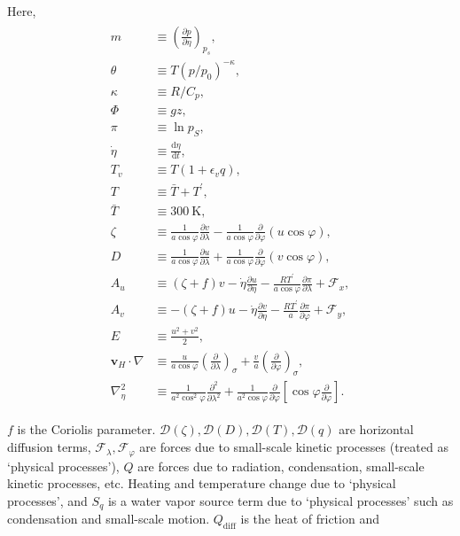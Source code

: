 Here, \begin{eqnarray}
\begin{aligned}
m &\equiv  \left(\frac{\partial p}{\partial \eta}\right)_{p_s}, \\
\theta  &\equiv   T \left( p/p_{0} \right)^{-\kappa}, \\
\kappa  &\equiv   R/C_{p}, \\
\Phi  &\equiv   gz, \\
\pi  &\equiv   \ln p_{S}, \\
\dot{\eta}  &\equiv    \frac{\mathrm{d}\eta}{\mathrm{d}t}, \\
T_v  &\equiv   T ( 1+\epsilon_v q ), \\
T  &\equiv   \bar{T} + T^{\prime}, \\
\bar{T}&\equiv 300 \ \mathrm{K}, \\
\zeta  &\equiv  \frac{1}{a \cos\varphi }
\frac{\partial v}{\partial \lambda}
-    \frac{1}{a \cos\varphi }
\frac{\partial }{\partial \varphi}
( u \cos\varphi ), \\
D  &\equiv \frac{1}{a \cos\varphi }
\frac{\partial u}{\partial \lambda}
+    \frac{1}{a \cos\varphi }
\frac{\partial }{\partial \varphi}
( v \cos\varphi ), \\
A_u  &\equiv ( \zeta + f ) v
- \dot{\eta} \frac{\partial u}{\partial \eta}
- \frac{RT^{\prime}}{a\cos\varphi}
\frac{\partial \pi}{\partial \lambda}
+ {\mathcal F}_x, \\
A_v  &\equiv - ( \zeta + f ) u
- \dot{\eta} \frac{\partial v}{\partial \eta}
- \frac{RT^{\prime}}{a}
\frac{\partial \pi}{\partial \varphi}
+ {\mathcal F}_y, \\
E  &\equiv \frac{u^{2}+v^{2}}{2}, \\
{\mathbf{v}}_{H} \cdot \nabla
&\equiv \frac{u}{a \cos \varphi}
\left( \frac{\partial }{\partial \lambda} \right)_{\sigma}
+ \frac{v}{a}
\left( \frac{\partial }{\partial \varphi} \right)_{\sigma}, \\
\nabla^{2}_{\eta}
&\equiv
\frac{1}{a^{2}\cos^2\varphi}
\frac{\partial^{2} }{\partial \lambda^{2}}
+ \frac{1}{a^{2}\cos\varphi}
\frac{\partial }{\partial \varphi}
\left[ \cos\varphi
\frac{\partial }{\partial \varphi} \right]. \end{aligned}\end{eqnarray}

\(f\) is the Coriolis parameter. \({\mathcal D}(\zeta), {\mathcal D}(D), {\mathcal D}(T), {\mathcal D}(q)\) are horizontal diffusion terms, \({\mathcal F}_\lambda, {\mathcal F}_\varphi\) are forces
due to small-scale kinetic processes (treated as `physical processes'), \(Q\) are forces due to radiation, condensation, small-scale kinetic processes, etc. Heating and temperature change due to
`physical processes', and \(S_q\) is a water vapor source term due to `physical processes' such as condensation and small-scale motion. \(Q_{\mathrm{diff}}\) is the heat of friction and


